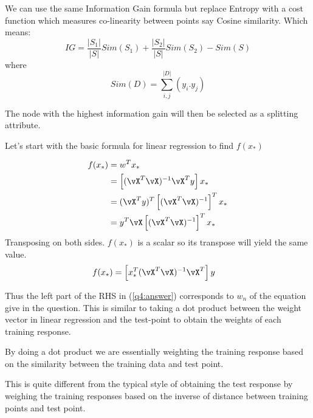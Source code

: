 \documentclass[a4paper,11pt]{article}
\begin{document}
\begin{mlsolution}

We can use the same Information Gain formula but replace Entropy with a cost function which measures co-linearity between points say Cosine similarity. Which means:
$$
IG = \frac{\lvert{S_1}\rvert}{\lvert{S}\rvert}Sim(S_1) + \frac{\lvert{S_2}\rvert}{\lvert{S}\rvert}Sim(S_2) - Sim(S)
$$
where
$$
Sim(D) = \sum_{i,j}^{|D|}{(y_i.y_j)}
$$

The node with the highest information gain will then be selected as a splitting attribute.

\end{mlsolution}

\begin{mlsolution}

Let's start with the basic formula for linear regression to find $f(x_*)$

\begin{align*}
f(x_*) &= w^Tx_*\\
       &= \left[ (\vX^T\vX)^{-1}\vX^Ty \right]x_*\\
       &= (\vX^Ty)^T\left[(\vX^T\vX)^{-1}\right]^T x_*\\
       &= y^T\vX\left[(\vX^T\vX)^{-1}\right]^T x_*
\end{align*}
Transposing on both sides. $f(x_*)$ is a scalar so its transpose will yield the same value.
\begin{align} \label{q4:answer}
f(x_*) &=  \left[x_*^T (\vX^T\vX)^{-1} \vX^T\right] y
\end{align}

Thus the left part of the RHS in (\ref{q4:answer}) corresponds to $w_n$ of the equation give in the question. This is similar to taking a dot product between the weight vector in linear regression and the test-point to obtain the weights of each training response.

By doing a dot product we are essentially weighting the training response based on the similarity between the training data and test point. 

This is quite different from the typical style of obtaining the test response by weighing the training responses based on the inverse of distance between training points and test point.
\end{mlsolution}
	
\end{document}
